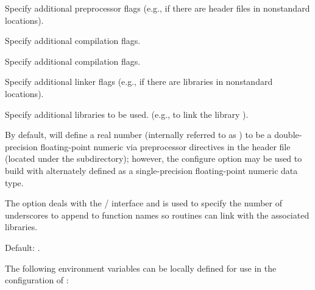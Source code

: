 \begin{config}
\item {}
  
  Specify additional {\C} preprocessor flags 
  (e.g.,  if there are header files in nonstandard locations).
  
\item {}
  
  Specify additional {\C} compilation flags.
  
\item {}
  
  Specify additional {\C} compilation flags.
  
\item {}
  
  Specify additional linker flags
  (e.g.,  if there are libraries in nonstandard locations).
  
\item {}
  
  Specify additional libraries to be used.
  (e.g.,  to link the library ).
  
\item {}
  
  By default, {\sundials} will define a real number (internally referred to as ) 
  to be a double-precision floating-point numeric via preprocessor directives in the header file
   (located under the  subdirectory); 
  however, the  configure option may be used to build {\sundials} with 
   alternately defined as a single-precision floating-point numeric data type.
  
\item {}
  
  The option deals with the {\F}/{\C} interface and is used to specify the number of underscores to 
  append to function names so {\F} routines can link with the associated {\sundials} libraries.
  
  Default: .
  
\end{config}


\vspace{0.25in}
\noindent The following environment variables can be locally defined for use in the configuration of {\sundials}:

